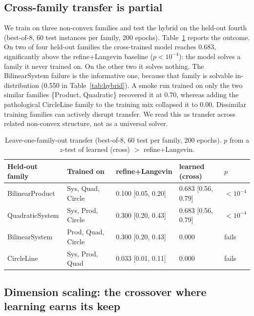 \documentclass[11pt]{article}
\begin{document}
\subsection{Cross-family transfer is partial}
\label{sec:transfer}

We train on three non-convex families and test the hybrid on the held-out fourth (best-of-8,
60 test instances per family, 200 epochs). Table~\ref{tab:transfer} reports the outcome. On
two of four held-out families the cross-trained model reaches 0.683, significantly above the
refine+Langevin baseline ($p < 10^{-4}$): the model solves a family it never trained on. On the
other two it solves nothing. The BilinearSystem failure is the informative one, because that
family is solvable in-distribution (0.550 in Table~\ref{tab:hybrid}). A smoke run trained on
only the two similar families \{Product, Quadratic\} recovered it at 0.70, whereas adding the
pathological CircleLine family to the training mix collapsed it to 0.00. Dissimilar training
families can actively disrupt transfer. We read this as transfer across related non-convex
structure, not as a universal solver.

\begin{table}[t]
\centering
\caption{Leave-one-family-out transfer (best-of-8, 60 test per family, 200 epochs). $p$ from a
$z$-test of learned (cross) $>$ refine+Langevin.}
\label{tab:transfer}
\small
\begin{tabular}{lllll}
\toprule
Held-out family & Trained on & refine+Langevin & learned (cross) & $p$ \\
\midrule
BilinearProduct & Sys, Quad, Circle  & 0.100 [0.05, 0.20] & 0.683 [0.56, 0.79] & $<10^{-4}$ \\
QuadraticSystem & Sys, Prod, Circle  & 0.300 [0.20, 0.43] & 0.683 [0.56, 0.79] & $<10^{-4}$ \\
BilinearSystem  & Prod, Quad, Circle & 0.300 [0.20, 0.43] & 0.000 & fails \\
CircleLine      & Sys, Prod, Quad    & 0.033 [0.01, 0.11] & 0.000 & fails \\
\bottomrule
\end{tabular}
\end{table}

\subsection{Dimension scaling: the crossover where learning earns its keep}
\label{sec:scaling}
\end{document}
